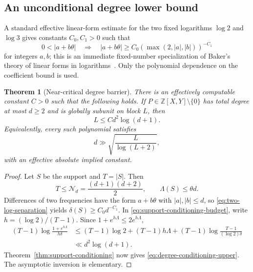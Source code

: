 \documentclass[11pt,oneside]{article}
\newtheorem{theorem}{Theorem}[section]
\theoremstyle{definition}
\theoremstyle{remark}
\newcommand{\Z}{\mathbb Z}
\newcommand{\tht}{\theta}
\newcommand{\Nm}{\mathcal N}
\begin{document}
\subsection{An unconditional degree lower bound}

A standard effective linear-form estimate for the two fixed logarithms $\log2$ and $\log3$
gives constants $C_0,C_1>0$ such that
\begin{equation}
  0<|a+b\tht|\quad\Longrightarrow\quad
  |a+b\tht|\ge C_0(\max(2,|a|,|b|))^{-C_1}
  \label{eq:two-log-separation}
\end{equation}
for integers $a,b$; this is an immediate fixed-number specialization of Baker's theory of linear
forms in logarithms~\cite{BakerWustholz,Matveev2000}.  Only the polynomial dependence on the
coefficient bound is used.

\begin{theorem}[Near-critical degree barrier]
\label{thm:unconditional-degree}
There is an effectively computable constant $C>0$ such that the following holds.  If
$P\in\Z[X,Y]\setminus\{0\}$ has total degree at most $d\ge2$ and is globally subunit on block $L$,
then
\begin{equation}
  L\le C d^2\log(d+1).
  \label{eq:degree-conditioning-upper}
\end{equation}
Equivalently, every such polynomial satisfies
\begin{equation}
  d\gg\sqrt{\frac{L}{\log(L+2)}},
  \label{eq:degree-conditioning-lower}
\end{equation}
with an effective absolute implied constant.
\end{theorem}

\begin{proof}
Let $S$ be the support and $T=|S|$.  Then
\[
  T\le\Nm_d=\frac{(d+1)(d+2)}2,
  \qquad \Lambda(S)\le\tht d.
\]
Differences of two frequencies have the form $a+b\tht$ with $|a|,|b|\le d$, so
\eqref{eq:two-log-separation} yields $\delta(S)\ge C_0d^{-C_1}$.  In
\eqref{eq:support-conditioning-budget}, write $h=(\log2)/(T-1)$.  Since
$1+e^{h\Lambda}\le2e^{h\Lambda}$,
\begin{align*}
  (T-1)\log\frac{1+e^{h\Lambda}}{h\delta}
  &\le (T-1)\log2+(T-1)h\Lambda
       +(T-1)\log\frac{T-1}{(\log2)\delta} \\
  &\ll d^2\log(d+1).
\end{align*}
Theorem~\ref{thm:support-conditioning} now gives \eqref{eq:degree-conditioning-upper}.  The
asymptotic inversion is elementary.
\end{proof}
\end{document}
